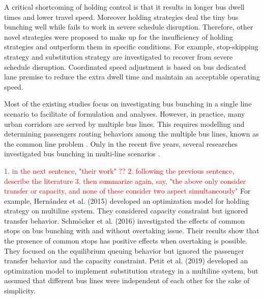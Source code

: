 \documentclass[smallextended]{svjour3}       %
\begin{document}
\begin{Abstract}
A critical shortcoming of holding control is that it results in longer bus dwell times and lower travel speed.
Moreover holding strategies deal the tiny bus bunching well while fails to work in severe schedule disruption.
Therefore, other novel strategies were proposed to make up for the insufficiency of holding strategies and outperform them in specific conditions. For example, stop-skipping strategy \citep{2003Fu,2005Sun} 
and substitution strategy \citep{2018Petit,2019Petit} are investigated to recover from severe schedule disruption. Coordinated speed adjustment \citep{2011Daganzo} is based on bus dedicated lane premise to reduce the extra dwell time and maintain an acceptable operating speed.

Most of the existing studies focus on investigating bus bunching in a single line scenario to facilitate of formulation and analyses. However, in practice, many urban corridors are served by multiple bus lines. This requires modelling and determining passengers routing behaviors among the multiple bus lines, known as the common line problem \citep{2015Argote-Cabanero}. 
Only in the recent five years, several researches investigated bus bunching in multi-line scenarios \citep{2015Carlos,2015Argote-Cabanero,2016Sun,2019Petit,2020Seman}. %

\textcolor{red}{
1. in the next sentence, "their work" ??
2. following the previous sentence, describe the literature 
3. then summarize again, say, "the above only consider transfer or capacity, and none of these consider two aspect simultaneously"
}
For example, Hernández et al. (2015) developed an optimization model for holding strategy on multiline system.
They considered capacity constraint but ignored transfer behavior. Schmöcker et al. (2016) investigated the effects of common stops on bus bunching with and without overtaking issue. 
Their results show that the presence of common stops has positive effects when overtaking is possible.
They focused on the equilibrium queuing behavior but ignored the passenger transfer behavior and the capacity constraint. 
Petit et al. (2019) developed an optimization model to implement substitution strategy 
in a multiline system, but assumed that different bus lines were independent of each other for the sake of simplicity. 


\end{Abstract}
\end{document}
